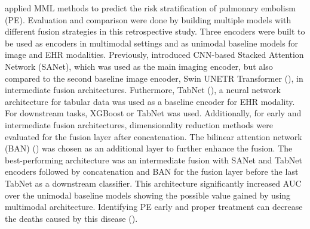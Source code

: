 \cite{pulmembol} applied MML methods to predict the risk stratification of pulmonary embolism (PE). Evaluation and comparison were done by building multiple models with different fusion strategies in this retrospective study. Three encoders were built to be used as encoders in multimodal settings and as unimodal baseline models for image and EHR modalities. Previously, \cite{pulm1st} introduced CNN-based Stacked Attention Network (SANet), which was used as the main imaging encoder, but also compared to the second baseline image encoder, Swin UNETR Transformer (\cite{SWIN}), in intermediate fusion architectures. Futhermore, TabNet (\cite{arik2020tabnet}), a neural network architecture for tabular data was used as a baseline encoder for EHR modality. For downstream tasks, XGBoost or TabNet was used. Additionally, for early and intermediate fusion architectures, dimensionality reduction methods were evaluated for the fusion layer after concatenation. The bilinear attention network (BAN) (\cite{kim2018bilinear}) was chosen as an additional layer to further enhance the fusion. The best-performing architecture was an intermediate fusion with SANet and TabNet encoders followed by concatenation and BAN for the fusion layer before the last TabNet as a downstream classifier. This architecture significantly increased AUC over the unimodal baseline models showing the possible value gained by using multimodal architecture. Identifying PE early and proper treatment can decrease the deaths caused by this disease (\cite{pulmembol}).


